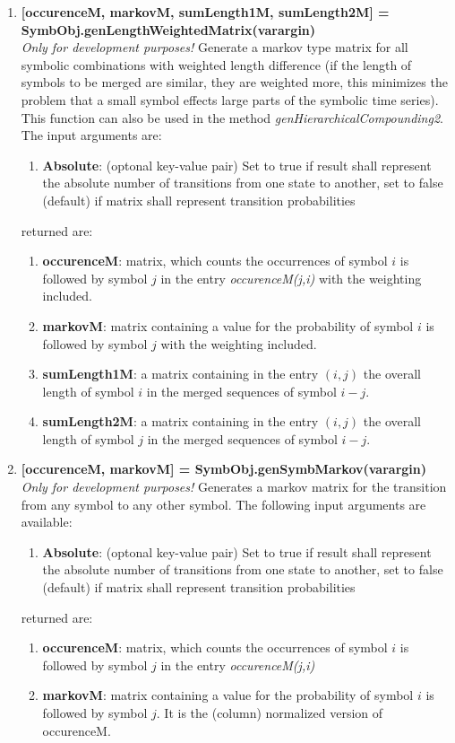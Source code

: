\documentclass[a4]{scrreprt}
\begin{document}
\begin{enumerate}
	\item \textbf{[occurenceM, markovM, sumLength1M, sumLength2M] = \\ SymbObj.genLengthWeightedMatrix(varargin)}\\
		\textit{Only for development purposes!} Generate a markov type  matrix for all symbolic combinations with weighted length difference (if the length of symbols to be merged are similar, they are weighted more, this minimizes the problem that a small symbol effects large parts of the symbolic time series). This function can also be used in the method \textit{genHierarchicalCompounding2}.
		The input arguments are:
		\begin{enumerate}
			\item \textbf{Absolute}: (optonal key-value pair) Set to true if result shall represent the  absolute number of transitions from one state to another, set to false (default) if matrix shall represent transition  probabilities
		\end{enumerate}
		returned are:
		\begin{enumerate}
			\item \textbf{occurenceM}: matrix, which counts the occurrences of symbol $i$ is followed by symbol $j$ in the entry \textit{occurenceM(j,i)}  with the weighting included.
			\item \textbf{markovM}:  matrix containing a value for the probability of symbol $i$ is followed by symbol $j$ with the weighting included.
			\item \textbf{sumLength1M}: a matrix containing in the entry $(i,j)$ the overall length of symbol $i$ in the merged sequences of symbol $i-j$.
			\item \textbf{sumLength2M}: a matrix containing in the entry $(i,j)$ the overall length of symbol $j$ in the merged sequences of symbol $i-j$.
		\end{enumerate}
	
	
	\item \textbf{[occurenceM, markovM] = SymbObj.genSymbMarkov(varargin)}\\
		\textit{Only for development purposes!} Generates a markov matrix for the transition from any symbol to any other symbol.
		The following input arguments are available:
		\begin{enumerate}
			\item \textbf{Absolute}: (optonal key-value pair) Set to true if result shall represent the  absolute number of transitions from one state to another, set to false (default) if matrix shall represent transition  probabilities
		\end{enumerate}
			returned are:
		\begin{enumerate}
			\item \textbf{occurenceM}: matrix, which counts the occurrences of symbol $i$ is followed by symbol $j$ in the entry \textit{occurenceM(j,i)}
			\item \textbf{markovM}:  matrix containing a value for the probability of symbol $i$ is followed by symbol $j$. It is the (column) normalized version of occurenceM.
		\end{enumerate}



\end{enumerate}
\end{document}
